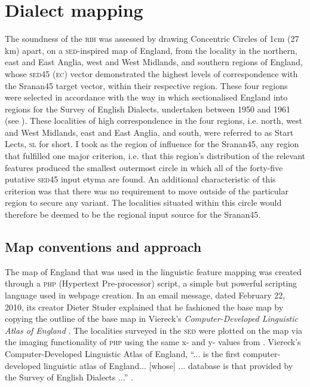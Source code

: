 \section{Dialect mapping}\label{5.4}
The soundness of the \textsc{rih} was assessed by drawing Concentric Circles of 1cm (27 km) apart, on a \textsc{\textsc{sed}}-inspired map of England, from the locality in the northern, east and East Anglia, west and West Midlands, and southern regions of England, whose \textsc{sed45} (\textsc{ec}) vector demonstrated the highest levels of correspondence with the Sranan45 target vector, within their respective region. These four regions were selected in accordance with the way in which \citet{Orton6271} sectionalised England into regions for the Survey of English Dialects, undertaken between 1950 and 1961 (see ). These localities of high correspondence in the four regions, i.e. north, west and West Midlands, east and East Anglia, and south, were referred to as Start Lects, \textsc{sl} for short. I took as the region of influence for the Sranan45, any region that fulfilled one major criterion, i.e. that this region's distribution of the relevant features produced the smallest outermost circle in which all of the forty-five putative \textsc{sed45} input etyma are found. An additional characteristic of this criterion was that there was no requirement to move outside of the particular region to secure any variant. The localities situated within this circle would therefore be deemed to be the regional input source for the Sranan45.

\subsection{Map conventions and approach}\label{5.4.1}
The map of England that was used in the linguistic feature mapping was created through a \textsc{php} (Hypertext Pre-processor) script, a simple but powerful scripting language used in webpage creation. In an email message, dated February 22, 2010, its creator Dieter Studer explained that he fashioned the base map by copying the outline of the base map in Viereck's  \emph{Computer-Developed Linguistic Atlas of England} \citep{Viereck90}. The localities surveyed in the \textsc{\textsc{sed}} were plotted on the map via the imaging functionality of \textsc{php} using the same x- and y- values from \citet{Viereck90}. Viereck's Computer-Developed Linguistic Atlas of England, ``... is the first computer-developed linguistic atlas of England... [whose] ... database is that provided by the Survey of English Dialects ...'' \citep[79]{Viereck97}.

